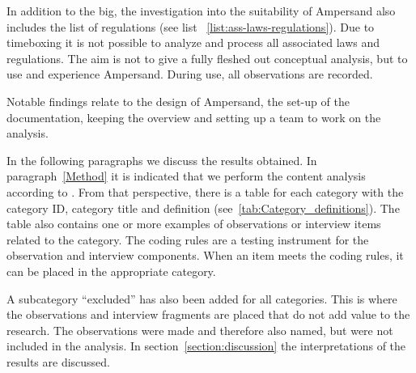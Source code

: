 
In addition to the \acrshort{big}, the investigation into the suitability of Ampersand also includes the list of regulations (see list ~\ref{list:ass-laws-regulations}).
Due to timeboxing it is not possible to analyze and process all associated laws and regulations.
The aim is not to give a fully fleshed out conceptual analysis, but to use and experience Ampersand.
During use, all observations are recorded.

Notable findings relate to the design of Ampersand, the set-up of the documentation, keeping the overview and setting up a team to work on the analysis.

In the following paragraphs we discuss the results obtained.
In paragraph~\ref{Method} it is indicated that we perform the content analysis according to \cite{mayring_qualitative_2000}.
From that perspective, there is a table for each category with the category ID, category title and definition (see~\ref{tab:Category_definitions}).
The table also contains one or more examples of observations or interview items related to the category.
The coding rules are a testing instrument for the observation and interview components.
When an item meets the coding rules, it can be placed in the appropriate category.

A subcategory ``excluded'' has also been added for all categories.
This is where the observations and interview fragments are placed that do not add value to the research.
The observations were made and therefore also named, but were not included in the analysis.
In section~\ref{section:discussion} the interpretations of the results are discussed.






